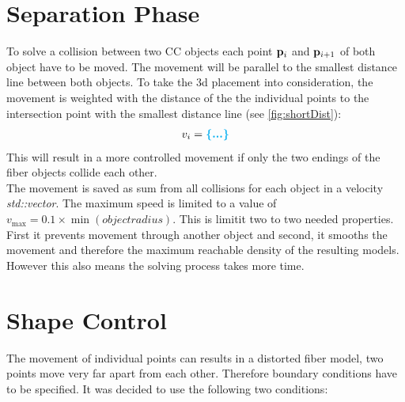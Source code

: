 \section{Separation Phase}
To solve a collision between two \ac{CC} objects each point $\mathbf{p}_i$ and $\mathbf{p}_{i+1}$ of both object have to be moved.
The movement will be parallel to the smallest distance line between both objects.
To take the 3d placement into consideration, the movement is weighted with the distance of the the individual points to the intersection point with the smallest distance line (see \cref{fig:shortDist}):
\begin{align}
v_i = \dummy
\end{align}
This will result in a more controlled movement if \eg only the two endings of the fiber objects collide each other.
\\
% 
The movement is saved as sum from all collisions for each object in a velocity \textit{std::vector}.
The maximum speed is limited to a value of $v_{\max} = 0.1 \times \min(\mathit{object radius})$.
This is limitit two to two needed properties. First it prevents movement through another object and second, it smooths the movement and therefore the maximum reachable density of the resulting models.
However this also means the solving process takes more time.
% 
\section{Shape Control}\label{chap5:ShapeControl}
The movement of individual points can results in a distorted fiber model, \eg two points move very far apart from each other.
Therefore boundary conditions have to be specified.
It was decided to use the following two conditions:
% 
